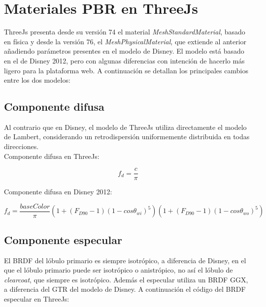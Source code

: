 \section{Materiales PBR en ThreeJs}

ThreeJs presenta desde su versi\'on 74 el material \textit{MeshStandardMaterial}, basado en f\'isica y desde la versi\'on
76, el \textit{MeshPhysicalMaterial}, que extiende al anterior a\~nadiendo par\'ametros presentes en el modelo de Disney.
El modelo est\'a basado en el de Disney 2012, pero con algunas diferencias con intenci\'on de hacerlo m\'as ligero
para la plataforma web. A continuaci\'on se detallan los principales cambios entre los dos modelos:

  \subsection{Componente difusa}
  Al contrario que en Disney, el modelo de ThreeJs utiliza directamente el modelo de Lambert, considerando un retrodispersi\'on
  uniformemente distribuida en todas direcciones.\\

  Componente difusa en ThreeJs:

  \begin{equation}
    f_d = \frac{c}{\pi}
  \end{equation}
  \singlespacing

  Componente difusa en Disney 2012:

  \begin{equation}
    f_d = \frac{baseColor}{\pi}
    \left(  1 + (F_{D90} - 1)(1 - cos\theta_{wi})^5  \right)
    \left(  1 + (F_{D90} - 1)(1 - cos\theta_{wo})^5  \right)
  \end{equation}
  \singlespacing


  \subsection{Componente especular}
  El BRDF del l\'obulo primario es siempre isotr\'opico, a diferencia de Disney, en el que el l\'obulo primario
  puede ser isotr\'opico o anistr\'opico, no as\'i el l\'obulo de \textit{clearcoat}, que siempre es isotr\'opico.
  Adem\'as el especular utiliza un BRDF GGX, a diferencia del GTR del modelo de Disney. A continuaci\'on el c\'odigo
  del BRDF especular en ThreeJs:

